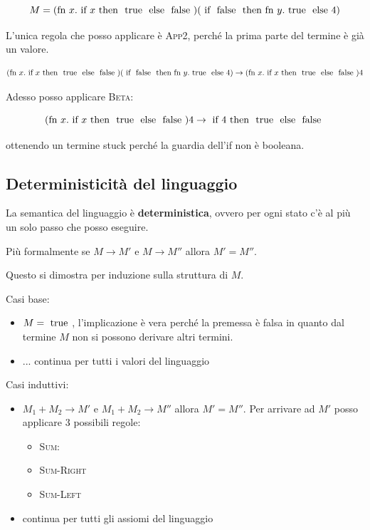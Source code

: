 $$M = (\text{fn } x.\text{ if } x \text{ then } \text{ true } \text{ else } \text{ false }) (\text{ if } \text{ false } \text{ then } \text{fn } y.\text{ true } \text{ else } 4)$$

L'unica regola che posso applicare è \textsc{App2}, perché la prima parte del termine è già un valore.

$$(\text{fn } x.\text{ if } x \text{ then } \text{ true } \text{ else } \text{ false }) (\text{ if } \text{ false } \text{ then } \text{fn } y.\text{ true } \text{ else } 4) \rightarrow (\text{fn } x.\text{ if } x \text{ then } \text{ true } \text{ else } \text{ false }) 4$$

Adesso posso applicare \textsc{Beta}:

$$(\text{fn } x.\text{ if } x \text{ then } \text{ true } \text{ else } \text{ false }) 4 \rightarrow \text{ if } 4 \text{ then } \text{ true } \text{ else } \text{ false }$$

ottenendo un termine stuck perché la guardia dell'if non è booleana.

\subsection{Deterministicità del linguaggio}

La semantica del linguaggio è \textbf{deterministica}, ovvero per ogni stato c'è al più un solo passo che posso eseguire.

Più formalmente se $M \rightarrow M'$ e $M \rightarrow M''$ allora $M' = M''$.

Questo si dimostra per induzione sulla struttura di $M$.

Casi base:
\begin{itemize}
	\item $M = \text{ true }$, l'implicazione è vera perché la premessa è falsa in quanto dal termine $M$ non si possono derivare altri termini.
	\item ... continua per tutti i valori del linguaggio 
\end{itemize}

Casi induttivi:
\begin{itemize}
	\item $M_1 + M_2 \rightarrow M'$ e $M_1 + M_2 \rightarrow M''$ allora $M' = M''$. Per arrivare ad $M'$ posso applicare 3 possibili regole:
	\begin{itemize}
		\item \textsc{Sum}: 
		\item \textsc{Sum-Right}
		\item \textsc{Sum-Left} 
	\end{itemize}
	\item continua per tutti gli assiomi del linguaggio
\end{itemize}

